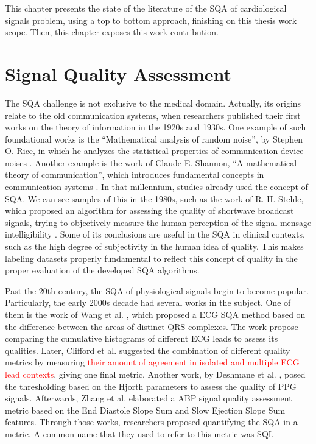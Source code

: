 

This chapter presents the state of the literature of the \gls{SQA} of cardiological signals problem, using a top to bottom approach, finishing on this thesis work scope. Then, this chapter exposes this work contribution.

\section{Signal Quality Assessment}

The \gls{SQA} challenge is not exclusive to the medical domain. Actually, its origins relate to the old communication systems, when researchers published their first works on the theory of information in the 1920s and 1930s. One example of such foundational works is the ``Mathematical analysis of random noise'', by Stephen O. Rice, in which he analyzes the statistical properties of communication device noises \cite{origins-1}. Another example is the work of Claude E. Shannon, ``A mathematical theory of communication'', which introduces fundamental concepts in communication systems \cite{origins-2}. In that millennium, studies already used the concept of \gls{SQA}. We can see samples of this in the 1980s, such as the work of R. H. Stehle, which proposed an algorithm for assessing the quality of shortwave broadcast signals, trying to objectively measure the human perception of the signal mensage intelligibility \cite{origins-3}. Some of its conclusions are useful in the \gls{SQA} in clinical contexts, such as the high degree of subjectivity in the human idea of quality. This makes labeling datasets properly fundamental to reflect this concept of quality in the proper evaluation of the developed \gls{SQA} algorithms.
	
Past the 20th century, the \gls{SQA} of physiological signals begin to become popular. Particularly, the early 2000s decade had several works in the subject. One of them is the work of Wang et al. \cite{2000s-1}, which proposed a \gls{ECG} \gls{SQA} method based on the difference between the areas of distinct QRS complexes. The work propose comparing the cumulative histograms of different \gls{ECG} leads to assess its qualities. Later, Clifford et al. \cite{2000s-2} suggested the combination of different quality metrics by measuring \textcolor{red}{their amount of agreement in isolated and multiple \gls{ECG} lead contexts}, giving one final metric. Another work, by Deshmane et al. \cite{2000s-3}, posed the thresholding based on the Hjorth parameters \cite{hjorth-parameters} to assess the quality of \gls{PPG} signals. Afterwards, Zhang et al. \cite{2000s-4} elaborated a \gls{ABP} signal quality assessment metric based on the End Diastole Slope Sum and Slow Ejection Slope Sum features. Through those works, researchers proposed quantifying the \gls{SQA} in a metric. A common name that they used to refer to this metric was \gls{SQI}. 


